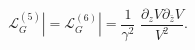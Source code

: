 \begin{equation}\label{Nilpotent}
{\mathcal L}_G^{(5)} |={\mathcal L}_G^{(6)} |=\frac{1}{\gamma^2}\,\,
 \frac{\partial_zV \partial_{\bar z}V}{V^2}.
\end{equation}

